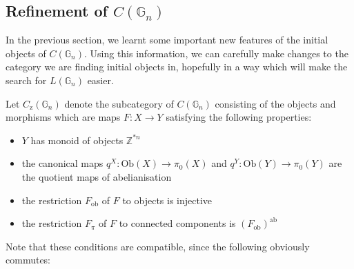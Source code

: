 \documentclass{amsart} %
\newenvironment{eq*}{\begin{equation*}}{\end{equation*}}
\begin{document}
\subsection{Refinement of $C(\mathbb{G}_n)$}

In the previous section, we learnt some important new features of the initial objects of $C(\mathbb{G}_n)$. Using this information, we can carefully make changes to the category we are finding initial objects in, hopefully in a way which will make the search for $L(\mathbb{G}_n)$ easier.

\begin{defi} Let $C_{\mathrm{z}}(\mathbb{G}_n)$ denote the subcategory of $C(\mathbb{G}_n)$ consisting of the objects and morphisms which are maps $F: X \to Y$ satisfying the following properties:
\begin{itemize}
\item $Y$ has monoid of objects $\mathbb{Z}^{\ast n}$
\item the canonical maps $q^X: \mathrm{Ob}(X) \to \pi_0(X)$ and $q^Y: \mathrm{Ob}(Y) \to \pi_0(Y)$ are the quotient maps of abelianisation
\item the restriction $F_{\mathrm{ob}}$ of $F$ to objects is injective
\item the restriction $F_\pi$ of $F$ to connected components is $(F_{\mathrm{ob}})^{\mathrm{ab}}$
\end{itemize}
\end{defi}

Note that these conditions are compatible, since the following obviously commutes:
\begin{eq*}  \end{eq*}
\end{document}
